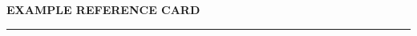 \documentclass[10pt,landscape,a4paper]{article}
\def\title#1{\hfil{\bf #1}\hfil\par\vskip 2pt\hrule}
\begin{document}
\begin{multicols*}{3}
  \title{EXAMPLE REFERENCE CARD}
  \vskip 0.3cm
  
  
  
  

\end{multicols*}
\end{document}
